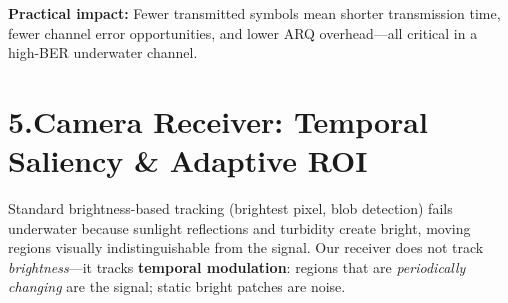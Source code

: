 \documentclass[10pt,a4paper]{article}
\begin{document}
\textbf{Practical impact:} Fewer transmitted symbols mean shorter transmission time,
fewer channel error opportunities, and lower ARQ overhead---all critical in a high-BER
underwater channel.

\section{5.\enspace Camera Receiver: Temporal Saliency \& Adaptive ROI}

Standard brightness-based tracking (brightest pixel, blob detection) fails underwater
because sunlight reflections and turbidity create bright, moving regions visually
indistinguishable from the signal.
Our receiver does not track \emph{brightness}---it tracks \textbf{temporal modulation}:
regions that are \emph{periodically changing} are the signal; static bright patches are noise.
\end{document}
